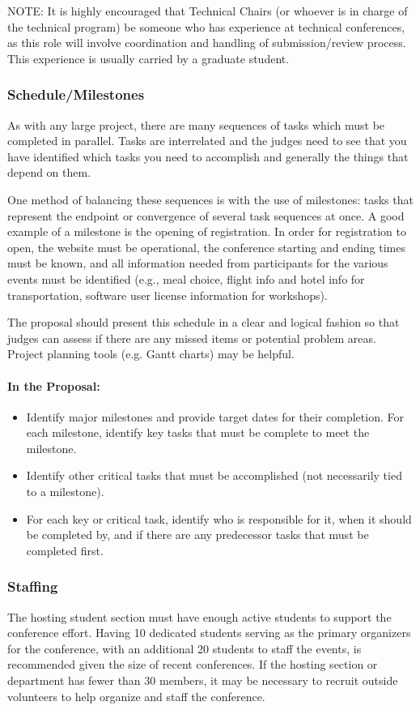 \documentclass[12pt]{article}
\begin{document}
NOTE: It is highly encouraged that Technical Chairs (or whoever is in charge of the technical program) be someone who has experience at technical conferences, as this role will involve coordination and handling of submission/review process. This experience is usually carried by a graduate student.

\subsubsection{Schedule/Milestones}
As with any large project, there are many sequences of tasks which must be completed in parallel. Tasks are interrelated and the judges need to see that you have identified which tasks you need to accomplish and generally the things that depend on them.

One method of balancing these sequences is with the use of milestones: tasks that represent the endpoint or convergence of several task sequences at once. A good example of a milestone is the opening of registration. In order for registration to open, the website must be operational, the conference starting and ending times must be known, and all information needed from participants for the various events must be identified (e.g., meal choice, flight info and hotel info for transportation, software user license information for workshops).

The proposal should present this schedule in a clear and logical fashion so that judges can assess if there are any missed items or potential problem areas. Project planning tools (e.g. Gantt charts) may be helpful.

\paragraph{In the Proposal:}
\begin{itemize}
\item{Identify major milestones and provide target dates for their completion. For each milestone, identify key tasks that must be complete to meet the milestone.}
\item{Identify other critical tasks that must be accomplished (not necessarily tied to a milestone).}
\item{For each key or critical task, identify who is responsible for it, when it should be completed by, and if there are any predecessor tasks that must be completed first.}
\end{itemize}

\subsubsection{Staffing}
The hosting student section must have enough active students to support the conference effort. Having 10 dedicated students serving as the primary organizers for the conference, with an additional 20 students to staff the events, is recommended given the size of recent conferences. If the hosting section or department has fewer than 30 members, it may be necessary to recruit outside volunteers to help organize and staff the conference.
\end{document}
